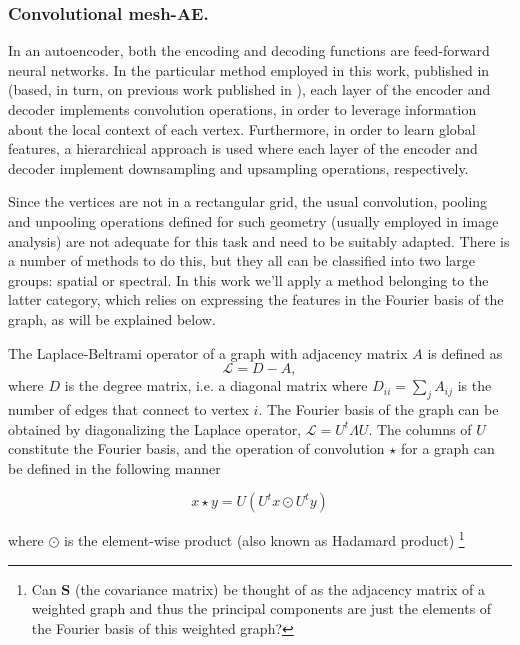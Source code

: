 \documentclass[twocolumn]{llncs}
\begin{document}

\subsubsection{Convolutional mesh-AE.}

In an autoencoder, both the encoding and decoding functions are feed-forward neural networks.
In the particular method employed in this work, published in \cite{ref_coma} (based, in turn, on previous work published in \cite{ref_spectral_graph_conv} ), each layer of the encoder and decoder implements convolution operations, in order to leverage information about the local context of each vertex. Furthermore, in order to learn global features, a hierarchical approach is used where each layer of the encoder and decoder implement downsampling and upsampling operations, respectively. 
 
Since the vertices are not in a rectangular grid, the usual convolution, pooling and unpooling operations defined for such geometry (usually employed in image analysis) are not adequate for this task and need to be suitably adapted. There is a number of methods to do this, but they all can be classified into two large groups: spatial or spectral. In this work we'll apply a method belonging to the latter category, which relies on expressing the features in the Fourier basis of the graph, as will be explained below.

The Laplace-Beltrami operator of a graph with adjacency matrix $A$ is defined as
\begin{equation}
\mathcal{L}=D-A,
\end{equation}{}
\noindent 
where $D$ is the degree matrix, i.e. a diagonal matrix where $D_{ii}=\sum_{j}A_{ij}$ is the number of edges that connect to vertex $i$. The Fourier basis of the graph can be obtained by diagonalizing the Laplace operator, $\mathcal{L}=U^t\Lambda U$. The columns of $U$ constitute the Fourier basis, and the operation of convolution $\star$ for a graph can be defined in the following manner

\begin{equation}
x\star y =U(U^tx\odot U^ty)
\end{equation}{}

\noindent where $\odot$ is the element-wise product (also known as Hadamard product)
\footnote{Can $\textbf{S}$ (the covariance matrix) be thought of as the adjacency matrix of a weighted graph and thus the principal components are just the elements of the Fourier basis of this weighted graph?}
\end{document}
